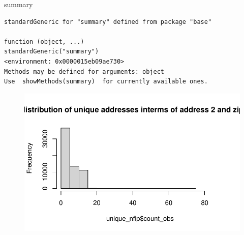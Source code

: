 \documentclass[
  letterpaper,
  DIV=11,
  numbers=noendperiod]{scrartcl}
\newenvironment{Shaded}{\begin{snugshade}}{\end{snugshade}}
\newcommand{\AttributeTok}[1]{\textcolor[rgb]{0.40,0.45,0.13}{#1}}
\newcommand{\DecValTok}[1]{\textcolor[rgb]{0.68,0.00,0.00}{#1}}
\newcommand{\DocumentationTok}[1]{\textcolor[rgb]{0.37,0.37,0.37}{\textit{#1}}}
\newcommand{\FunctionTok}[1]{\textcolor[rgb]{0.28,0.35,0.67}{#1}}
\newcommand{\NormalTok}[1]{\textcolor[rgb]{0.00,0.23,0.31}{#1}}
\newcommand{\SpecialCharTok}[1]{\textcolor[rgb]{0.37,0.37,0.37}{#1}}
\newcommand{\StringTok}[1]{\textcolor[rgb]{0.13,0.47,0.30}{#1}}
\begin{document}
\begin{Shaded}
\begin{Highlighting}[]
\NormalTok{summary}
\end{Highlighting}
\end{Shaded}

\begin{verbatim}
standardGeneric for "summary" defined from package "base"

function (object, ...) 
standardGeneric("summary")
<environment: 0x0000015eb09ae730>
Methods may be defined for arguments: object
Use  showMethods(summary)  for currently available ones.
\end{verbatim}

\begin{Shaded}
\end{Shaded}

\begin{figure}[H]

{\centering \includegraphics{Gayan_Udugama_Final_Project_files/figure-pdf/unnamed-chunk-7-1.pdf}

}

\end{figure}

\begin{Shaded}
\end{Shaded}
\end{document}
